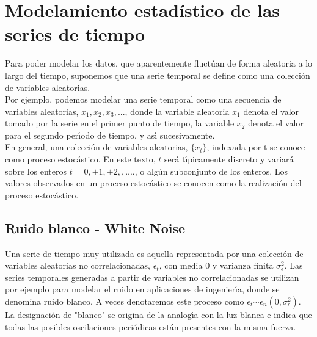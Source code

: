 \section{Modelamiento estad\'istico de las series de tiempo}
	Para poder modelar los datos, que aparentemente fluct\'uan de forma aleatoria a lo largo del tiempo, suponemos que una serie temporal se define como una colecci\'on de variables aleatorias. 
	\\
	Por ejemplo, podemos modelar  una serie temporal como una secuencia de variables aleatorias, $x_1, x_2, x_3,...$, donde la variable aleatoria $x_1$ denota el valor tomado por la serie en el primer punto de tiempo, la variable $x_2$  denota el valor para el segundo per\'\i{}odo de tiempo, y as\'\i{} sucesivamente. 
	\\
	En general, una colecci\'on de variables aleatorias,  $\{x_t\}$, indexada por t se conoce como proceso estoc\'astico. En este texto, $t$ ser\'a t\'\i{}picamente discreto y variar\'a sobre los enteros $t = 0, \pm1, \pm2,,.... $, o alg\'un subconjunto de los enteros. Los valores observados en un proceso estoc\'astico se conocen como la realizaci\'on del proceso estoc\'astico.	
\subsection{Ruido blanco - White Noise}
Una serie de tiempo muy utilizada es aquella representada por una colecci\'on de variables aleatorias no correlacionadas, $\epsilon_t$, con media $0$ y varianza finita $\sigma^2_\epsilon$. Las series temporales generadas a partir de variables no correlacionadas se utilizan por ejemplo para modelar el ruido en aplicaciones de ingenier\'\i{}a, donde se denomina ruido blanco. A veces denotaremos este proceso como $\epsilon_t$$\sim$$\epsilon_n (0, \sigma^2_\epsilon)$. La designaci\'on de "blanco" se origina de la analog\'\i{}a con la luz blanca e indica que todas las posibles oscilaciones peri\'odicas est\'an presentes con la misma fuerza.



